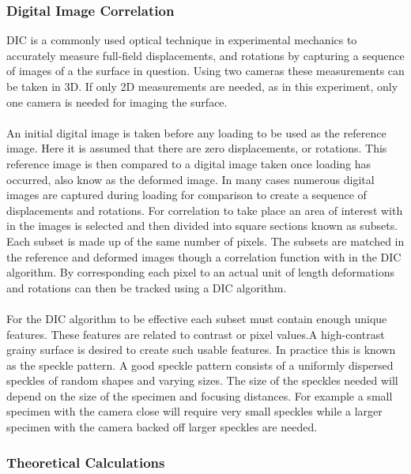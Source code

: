 \documentclass[12pt]{article}
\begin{document}
\subsubsection{Digital Image Correlation} %
DIC is a commonly used optical technique in experimental mechanics to accurately measure full-field displacements, and rotations by capturing a sequence of images of a the surface in question. Using two cameras these measurements can be taken in 3D. If only 2D measurements are needed, as in this experiment, only one camera is needed for imaging the surface.
\\
\\
An initial digital image is taken before any loading to be used as the reference image. Here it is assumed that there are zero displacements, or rotations.  This reference image is then compared to a digital image taken once loading has occurred, also know as the deformed image. In many cases numerous digital images are captured during loading for comparison to create a sequence of displacements and rotations.  For correlation to take place an area of interest with in the images is selected and then divided into square sections known as subsets. Each subset is made up of the same number of pixels.  The subsets are matched in the reference and deformed images though a correlation function with in the DIC algorithm. By corresponding each pixel to an actual unit of length deformations and rotations can then be tracked using a DIC algorithm.
\\
\\
For the DIC algorithm to be effective each subset must contain enough unique features.  These features are related to contrast or pixel values.A high-contrast grainy surface is desired to create such usable features. In practice this is known as the speckle pattern. A good speckle pattern consists of a uniformly dispersed speckles of  random shapes and varying sizes. The size of the speckles needed will depend on the size of the specimen and focusing distances. For example a small specimen with the camera close will require very small speckles while a larger specimen with the camera backed off larger speckles are needed. 

\subsubsection{Theoretical Calculations} %
\end{document}
